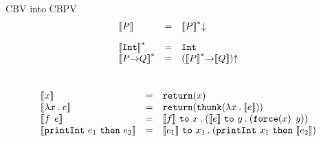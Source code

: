 \documentclass[letterpaper,10pt,aspectratio=169,dvipsnames]{beamer}
\begin{document}
\begin{frame}{CBV into CBPV}
  \[
    \begin{array}{lcl}
      {\llbracket P \rrbracket} & = & {{{\llbracket P \rrbracket}^{*}} {\mathtt{\downarrow}}}\\[1em]
      {{\llbracket {\ensuremath{{\mathtt{Int}}}}\rrbracket}^{*}} & = & {{\mathtt{Int}}}\\
      {{\llbracket {\ensuremath{P {\mathtt{\to}} Q}} \rrbracket}^{*}} & = & {({{{\llbracket P \rrbracket}^{*}} {\mathtt{\to}} {\llbracket Q \rrbracket}}) {\mathtt{\uparrow}}}\\
    \end{array}
  \]\\[2em]
  \[
    \begin{array}{lcl}
      \embed{x} & = & \tmReturn{x}\\
      \embed{\tmLam x e} & = & \tmReturn{\tmThunk{\tmLam x {\embed e}}}\\
      \embed{\tmApp f e} & = & \tmTo {\embed f} x {(\tmTo {\embed e} y {(\tmApp {\tmForce x} y)})}\\
      \embed{\tmPrintInt {e_1} {e_2}} & = & \tmTo {\embed {e_1}} {x_1} {(\tmPrintInt {x_1} {\embed {e_2}})}\\
    \end{array}
  \]
\end{frame}
\end{document}
